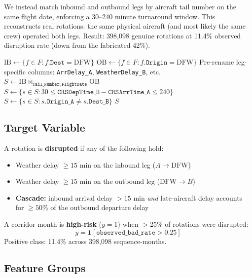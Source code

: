 \documentclass[11pt, twoside]{article}
\begin{document}
We instead match inbound and outbound legs by aircraft tail number on the same
flight date, enforcing a 30--240 minute turnaround window.  This reconstructs
real rotations: the same physical aircraft (and most likely the same crew)
operated both legs.  Result: 398,098 genuine rotations at 11.4\% observed
disruption rate (down from the fabricated 42\%).

\begin{algorithm}[H]
\caption{Tail-Matched Sequence Construction}
\label{alg:tailmatch}
$\text{IB} \gets \{f \in F : f.\texttt{Dest} = \text{DFW}\}$ 
$\text{OB} \gets \{f \in F : f.\texttt{Origin} = \text{DFW}\}$ 
Pre-rename leg-specific columns: \texttt{ArrDelay\_A}, \texttt{WeatherDelay\_B}, etc.\;
$S \gets \text{IB} \bowtie_{\texttt{Tail\_Number},\,\texttt{FlightDate}} \text{OB}$\;
$S \gets \{s \in S : 30 \le \texttt{CRSDepTime\_B} - \texttt{CRSArrTime\_A} \le 240\}$\;
$S \gets \{s \in S : s.\texttt{Origin\_A} \ne s.\texttt{Dest\_B}\}$ 
\Return $S$
\end{algorithm}

\subsection{Target Variable}
\label{sec:target}

A rotation is \textbf{disrupted} if any of the following hold:
\begin{itemize}
  \item Weather delay $\ge 15$ min on the inbound leg ($A \to \text{DFW}$)
  \item Weather delay $\ge 15$ min on the outbound leg ($\text{DFW} \to B$)
  \item \textbf{Cascade:} inbound arrival delay $> 15$ min \emph{and}
        late-aircraft delay accounts for $\ge 50\%$ of the outbound departure delay
\end{itemize}

A corridor-month is \textbf{high-risk} ($y = 1$) when $>$25\% of rotations were disrupted:
\begin{equation}
  y = \mathbf{1}\!\left[\texttt{observed\_bad\_rate} > 0.25\right]
\end{equation}
Positive class: 11.4\% across 398,098 sequence-months.

\subsection{Feature Groups}
\end{document}
